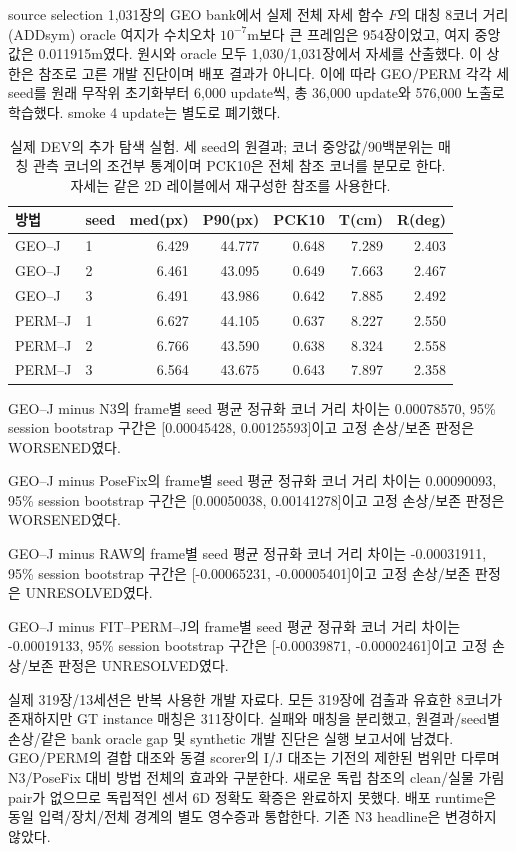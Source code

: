 source selection 1,031장의 GEO bank에서 실제 전체 자세 함수 $F$의 대칭 8코너 거리(ADDsym) oracle 여지가 수치오차 $10^{-7}$m보다 큰 프레임은 954장이었고, 여지 중앙값은 0.011915m였다. 원시와 oracle 모두 1,030/1,031장에서 자세를 산출했다. 이 상한은 참조로 고른 개발 진단이며 배포 결과가 아니다. 이에 따라 GEO/PERM 각각 세 seed를 원래 무작위 초기화부터 6,000 update씩, 총 36,000 update와 576,000 노출로 학습했다. smoke 4 update는 별도로 폐기했다.

\begin{table}[t]\centering\small\caption{실제 DEV의 추가 탐색 실험. 세 seed의 원결과; 코너 중앙값/90백분위는 매칭 관측 코너의 조건부 통계이며 PCK10은 전체 참조 코너를 분모로 한다. 자세는 같은 2D 레이블에서 재구성한 참조를 사용한다.}\label{sup:joint_action_results}\begin{tabular}{llrrrrr}\toprule 방법&seed&med(px)&P90(px)&PCK10&T(cm)&R(deg)\\\midrule

GEO--J & 1 & 6.429 & 44.777 & 0.648 & 7.289 & 2.403\\

GEO--J & 2 & 6.461 & 43.095 & 0.649 & 7.663 & 2.467\\

GEO--J & 3 & 6.491 & 43.986 & 0.642 & 7.885 & 2.492\\

PERM--J & 1 & 6.627 & 44.105 & 0.637 & 8.227 & 2.550\\

PERM--J & 2 & 6.766 & 43.590 & 0.638 & 8.324 & 2.558\\

PERM--J & 3 & 6.564 & 43.675 & 0.643 & 7.897 & 2.358\\

\bottomrule\end{tabular}\end{table}

GEO--J minus N3의 frame별 seed 평균 정규화 코너 거리 차이는 0.00078570, 95\% session bootstrap 구간은 [0.00045428, 0.00125593]이고 고정 손상/보존 판정은 WORSENED였다.

GEO--J minus PoseFix의 frame별 seed 평균 정규화 코너 거리 차이는 0.00090093, 95\% session bootstrap 구간은 [0.00050038, 0.00141278]이고 고정 손상/보존 판정은 WORSENED였다.

GEO--J minus RAW의 frame별 seed 평균 정규화 코너 거리 차이는 -0.00031911, 95\% session bootstrap 구간은 [-0.00065231, -0.00005401]이고 고정 손상/보존 판정은 UNRESOLVED였다.

GEO--J minus FIT--PERM--J의 frame별 seed 평균 정규화 코너 거리 차이는 -0.00019133, 95\% session bootstrap 구간은 [-0.00039871, -0.00002461]이고 고정 손상/보존 판정은 UNRESOLVED였다.

실제 319장/13세션은 반복 사용한 개발 자료다. 모든 319장에 검출과 유효한 8코너가 존재하지만 GT instance 매칭은 311장이다. 실패와 매칭을 분리했고, 원결과/seed별 손상/같은 bank oracle gap 및 synthetic 개발 진단은 실행 보고서에 남겼다. GEO/PERM의 결합 대조와 동결 scorer의 I/J 대조는 기전의 제한된 범위만 다루며 N3/PoseFix 대비 방법 전체의 효과와 구분한다. 새로운 독립 참조의 clean/실물 가림 pair가 없으므로 독립적인 센서 6D 정확도 확증은 완료하지 못했다. 배포 runtime은 동일 입력/장치/전체 경계의 별도 영수증과 통합한다. 기존 N3 headline은 변경하지 않았다.
